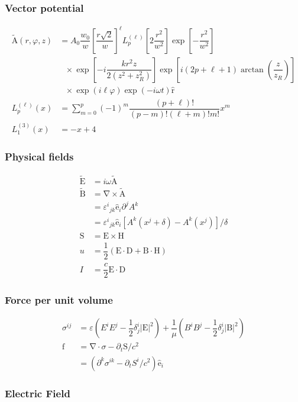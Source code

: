 \documentclass[xcolor=dvipsnames]{beamer}
\renewcommand{\c}{\cdot} %
\newcommand{\f}[2]{\dfrac{#1}{#2}} %
\newcommand{\p}[1]{\left(#1\right)} %
\renewcommand{\sp}[1]{\left[#1\right]} %
\newcommand{\abs}[1]{\left|#1\right|} %
\renewcommand{\epsilon}{\varepsilon} %
\renewcommand{\phi}{\varphi} %
\renewcommand{\v}[1]{\boldsymbol{\mathrm{#1}}} %
\newcommand{\uv}[1]{\hat{\boldsymbol{\mathrm{#1}}}} %
\newcommand{\del}{\v\nabla} %
\renewcommand{\d}{\partial} %
\newcommand{\cxv}[1]{\v{\widetilde{#1}}} %
\begin{document}
\begin{frame}
  \frametitle{Vector potential}
  \begin{align*}
    {\cxv A}\p{r,\phi,z}&=A_0\f{w_0}{w}\sp{\f{r\sqrt 2}{w}}^\ell
    L^{\p{\ell}}_p\sp{2\f{r^2}{w^2}}\exp\sp{-\f{r^2}{w^2}} \\
    &~~~\times\exp\sp{-i\f{kr^2z}{2\p{z^2+z_R^2}}}
    \exp\sp{i\p{2p+\ell+1}\arctan\p{\f z{z_R}}} \\
    &~~~\times\exp\p{i\ell\phi}\exp\p{-i\omega t} \uv r \\
    L^{\p{\ell}}_p\p{x}
    &=\sum_{m=0}^p\p{-1}^m\f{\p{p+\ell}!}{\p{p-m}!\p{\ell+m}!m!}x^m \\
    L^{\p{3}}_1\p{x}&=-x+4
  \end{align*}
\end{frame}

\begin{frame}
  \frametitle{Physical fields}
  \begin{align*}
    \cxv E&=i\omega\cxv A \\
    \cxv B&=\del \times\cxv A \\
    &={\varepsilon^i}_{jk}\uv e_i\d^jA^k \\
    &={\varepsilon^i}_{jk}\uv
    e_i\sp{A^k\p{x^j+\delta}-A^k\p{x^j}}/\delta \\
    \v S&=\v E\times\v H \\
    u&=\f12\p{\v E\c\v D+\v B\c\v H} \\
    I&=\f c2\v E\c\v D
  \end{align*}
\end{frame}

\begin{frame}
  \frametitle{Force per unit volume}
  \begin{align*}
    \sigma^{ij}&=\epsilon\p{E^iE^j-\f12\delta^i_j\abs{\v E}^2}
    +\f1\mu\p{B^iB^j-\f12\delta^i_j\abs{\v B}^2} \\
    \v f&=\del\c\sigma-\d_t\v S/c^2 \\
    &=\p{\d^k\sigma^{ik}-\d_tS^i/c^2}\uv e_i
  \end{align*}
\end{frame}

\begin{frame}
  \frametitle{Electric Field}
  \begin{columns}[T,totalwidth=\textwidth]
    \begin{figure}[h]
      \centering {}
    \end{figure}

    \begin{figure}[h]
      \centering \vspace{-.6in} 
    \end{figure}

  \end{columns}
\end{frame}
\end{document}
